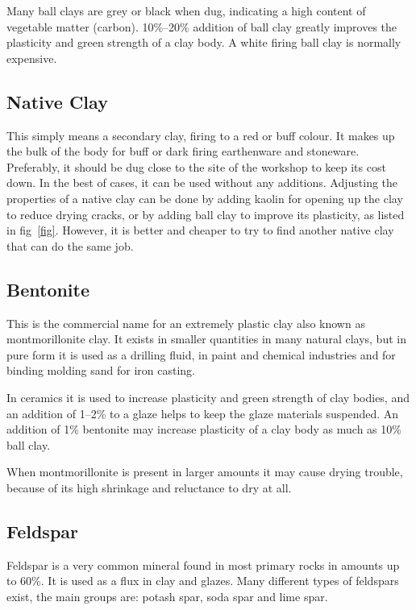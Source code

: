 Many ball clays are grey or black when dug, indicating a high content of 
vegetable matter (carbon). 10\%--20\% addition of ball clay greatly improves 
the plasticity and green strength of a clay body. A white firing ball clay is 
normally expensive.
\subsection{Native Clay}
This simply means a secondary clay, firing to a red or buff colour. It makes up 
the bulk of the body for buff or dark firing earthenware and stoneware. 
Preferably, it should be dug close to the site of the workshop to keep its cost 
down. In the best of cases, it can be used without any additions. Adjusting the 
properties of a native clay can be done by adding kaolin for opening up the 
clay to reduce drying cracks, or by adding ball clay to improve its plasticity, 
as listed in fig~\ref{fig}. However, it is better and cheaper to try to find 
another 
native clay that can do the same job.
\subsection{Bentonite}
This is the commercial name for an extremely plastic clay also known as 
montmorillonite clay. It exists in smaller quantities in many natural clays, 
but in pure form it is used as a drilling fluid, in paint and chemical 
industries and for binding molding sand for iron casting.

In ceramics it is used to increase plasticity and green strength of clay 
bodies, and an addition of 1--2\% to a glaze helps to keep the glaze materials 
suspended. An addition of 1\% bentonite may increase plasticity of a clay body 
as much as 10\% ball clay.

When montmorillonite is present in larger amounts it may cause drying trouble, 
because of its high shrinkage and reluctance to dry at all.
\subsection{Feldspar}
Feldspar is a very common mineral found in most primary rocks in amounts up to 
60\%. It is used as a flux in clay and glazes. Many different types of 
feldspars exist, the main groups are: potash spar, soda spar and lime spar. 

